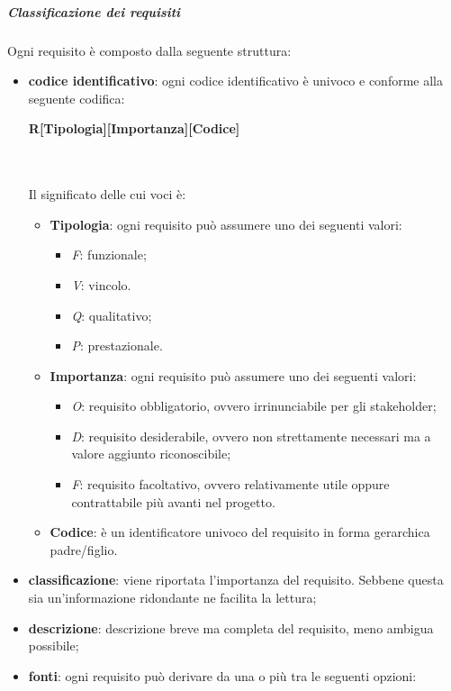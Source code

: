 			\noindent
			\subparagraph{Classificazione dei requisiti}
			Ogni requisito è composto dalla seguente struttura:
			\begin{itemize}
				\item \textbf{codice identificativo}: ogni codice identificativo è univoco e conforme alla seguente codifica: \\
				\centerline{\textbf{R[Tipologia][Importanza][Codice]}} \\ \\
				Il significato delle cui voci è:
				\begin{itemize}					
					\item \textbf{Tipologia}: ogni requisito può assumere uno dei seguenti valori:
					\begin{itemize}
						\item \textit{F}: funzionale;
						\item \textit{V}: vincolo.
						\item \textit{Q}: qualitativo;
						\item \textit{P}: prestazionale.		
					\end{itemize}
				\item \textbf{Importanza}: ogni requisito può assumere uno dei seguenti valori:
				\begin{itemize}
					\item \textit{O}: requisito obbligatorio, ovvero irrinunciabile per gli stakeholder\glo;
					\item \textit{D}: requisito desiderabile, ovvero non strettamente necessari ma a valore aggiunto riconoscibile;
					\item \textit{F}: requisito facoltativo, ovvero relativamente utile oppure contrattabile più avanti nel progetto.	
				\end{itemize}
					\item \textbf{Codice}: è un identificatore univoco del requisito in forma gerarchica padre/figlio.
				\end{itemize}
				\item \textbf{classificazione}: viene riportata l'importanza del requisito. Sebbene questa sia un'informazione ridondante ne facilita la lettura;
				\item \textbf{descrizione}: descrizione breve ma completa del requisito, meno ambigua possibile;
				\item \textbf{fonti}: ogni requisito può derivare da una o più tra le seguenti opzioni:
				\begin{itemize}

\end{itemize}
\end{itemize}
